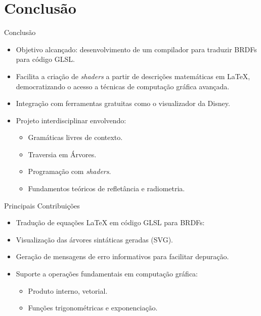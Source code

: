 \section{Conclusão}

\begin{frame}{Conclusão}
    \begin{itemize}
        \item Objetivo alcançado: desenvolvimento de um compilador para traduzir BRDFs para código GLSL.
        \item Facilita a criação de \textit{shaders} a partir de descrições matemáticas em \LaTeX{}, democratizando o acesso a técnicas de computação gráfica avançada.
        \item Integração com ferramentas gratuitas como o visualizador da Disney.
        \item Projeto interdisciplinar envolvendo:
        \begin{itemize}
            \item Gramáticas livres de contexto.
            \item Traversia em Árvores.
            \item Programação com \textit{shaders}.
            \item Fundamentos teóricos de refletância e radiometria.
        \end{itemize}
    \end{itemize}
\end{frame}

\begin{frame}{Principais Contribuições}
    \begin{itemize}
        \item Tradução de equações \LaTeX{} em código GLSL para BRDFs:
        \item Visualização das árvores sintáticas geradas (SVG).
        \item Geração de mensagens de erro informativos para facilitar depuração.
        \item Suporte a operações fundamentais em computação gráfica:
        \begin{itemize}
            \item Produto interno, vetorial.
            \item Funções trigonométricas e exponenciação.
        \end{itemize}
    \end{itemize}
\end{frame}

